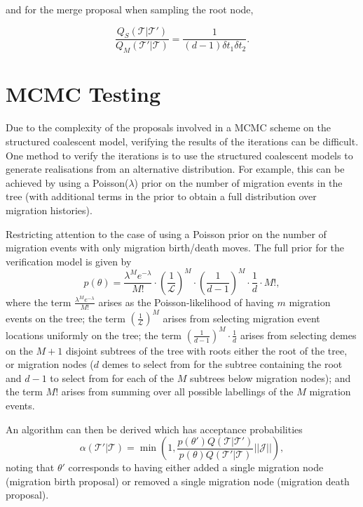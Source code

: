 \documentclass[12pt,a4paper]{article}
\newcommand{\calJ}{\mathcal{J}}
\newcommand{\calL}{\mathcal{L}}
\newcommand{\calT}{\mathcal{T}}
\begin{document}
				and for the merge proposal when sampling the root node,
				
				\[
					\frac{Q_S(\calT | \calT')}{Q_M (\calT' | \calT)} = \frac{1}{(d-1) \delta t_1 \delta t_2}.
				\]
				
	\section{MCMC Testing}
		Due to the complexity of the proposals involved in a MCMC scheme on the structured coalescent model, verifying the results of the iterations can be difficult. One method to verify the iterations is to use the structured coalescent models to generate realisations from an alternative distribution. For example, this can be achieved by using a Poisson($\lambda$) prior on the number of migration events in the tree (with additional terms in the prior to obtain a full distribution over migration histories).
		
		Restricting attention to the case of using a Poisson prior on the number of migration events with only migration birth/death moves. The full prior for the verification model is given by
			\[
				p(\theta) = \frac{\lambda^M e^{-\lambda}}{M!} \cdot \left( \frac{1}{\calL} \right)^M \cdot \left( \frac{1}{d-1} \right)^M \cdot \frac{1}{d} \cdot M!,
			\]
		where the term $\frac{\lambda^M e^{-\lambda}}{M!}$ arises as the Poisson-likelihood of having $m$ migration events on the tree; the term $\left( \frac{1}{\calL} \right)^M$ arises from selecting migration event locations uniformly on the tree; the term $\left( \frac{1}{d-1} \right)^M \cdot \frac{1}{d}$ arises from selecting demes on the $M+1$ disjoint subtrees of the tree with roots either the root of the tree, or migration nodes ($d$ demes to select from for the subtree containing the root and $d-1$ to select from for each of the $M$ subtrees below migration nodes); and the term $M!$ arises from summing over all possible labellings of the $M$ migration events.
		
		An algorithm can then be derived which has acceptance probabilities
			\[
				\alpha (\calT' | \calT) = \min \left(1, \frac{p(\theta') Q(\calT | \calT')}{p(\theta) Q(\calT' | \calT)} || \calJ ||\right),
			\]
		noting that $\theta'$ corresponds to having either added a single migration node (migration birth proposal) or removed a single migration node (migration death proposal).
		
\end{document}
